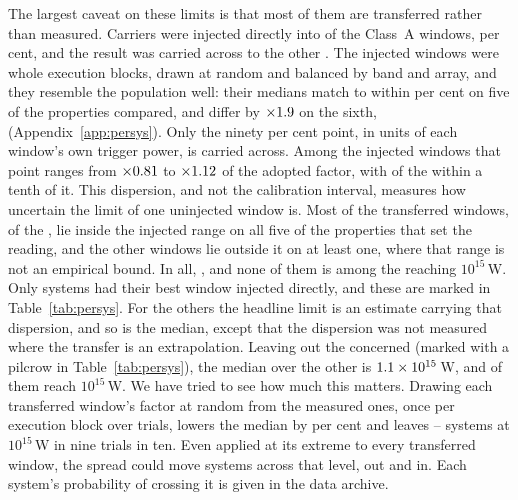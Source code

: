 The largest caveat on these limits is that most of them are
transferred rather than measured. Carriers were injected directly into
\SensNInj{} of the \NWinA{} Class~A windows, \SensNInjPct{} per cent, and the
result was carried across to the other \SensNTransfer. The injected windows
were whole execution blocks, drawn at random and balanced by band and array,
and they resemble the population well: their medians match to within
\RpCovOtherPct{} per cent on five of the \RpNAxis{} properties compared, and
differ by $\times1.9$ on the sixth, \RpCovWorstAxis{}
(Appendix~\ref{app:persys}). Only the ninety per cent point, in units of each
window's own trigger power, is carried across. Among the injected windows
that point ranges from $\times0.81$ to $\times1.12$ of
the adopted factor, with \NmDispNTenth{} of the \SensNInj{} within a tenth of
it. This dispersion, and not the calibration interval, measures how
uncertain the limit of one uninjected window is. Most of
the transferred windows, \NgNInterpWin{} of the \SensNTransfer, lie inside
the injected range on all five of the properties that set the reading, and
the other \NgNExtrapWin{} windows lie outside it on at least one, where that range is not an
empirical bound. In all, \NgExtrapTakeClause, and none of them is among the
\NSysEfifteen{} reaching $10^{15}$\,W. Only \SmcNMeasSys{} systems had their
best window injected directly, and these are marked in
Table~\ref{tab:persys}. For the others the headline limit is an estimate
carrying that dispersion, and so is the median, except that the dispersion
was not measured where the transfer is an extrapolation. Leaving out the
\NgNExtrapSys{} \NgExtrapSysNoun{} concerned (marked with a pilcrow in
Table~\ref{tab:persys}), the median over the other \NgNSysInterpSum{} is
$1.1\times10^{15}$\,W, and \NgNSysEfifteenInterp{} of them reach
$10^{15}$\,W. We have tried to see how much this
matters. Drawing each transferred window's factor at random from the measured
ones, once per execution block over \SvNTrial{} trials, lowers the median by
\SvRsMedShiftPct{} per cent and leaves \SvRsBlkNLo--\SvRsBlkNHi{} systems at
$10^{15}$\,W in nine trials in ten. Even applied at its extreme to every
transferred window, the spread could move \SvSprN{} systems across that
level, \SvSprNOut{} out and \SvSprNIn{} in. Each system's probability of
crossing it is given in the data archive.

